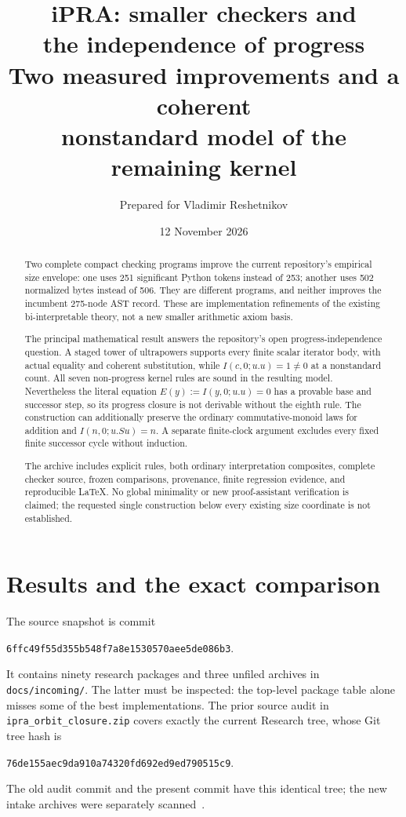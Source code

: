 \documentclass[11pt,letterpaper]{article}
\title{\textbf{iPRA: smaller checkers and\\the independence of progress}\\[0.6em]\large Two measured improvements and a coherent\\nonstandard model of the remaining kernel}
\author{Prepared for Vladimir Reshetnikov}
\date{12 November 2026}
\theoremstyle{definition}
\newcommand{\file}[1]{{\small\nolinkurl{#1}}}
\begin{document}
\maketitle
\begin{abstract}
Two complete compact checking programs improve the current repository's empirical size envelope: one uses 251 significant Python tokens instead of 253; another uses 502 normalized bytes instead of 506. They are different programs, and neither improves the incumbent 275-node AST record. These are implementation refinements of the existing bi-interpretable theory, not a new smaller arithmetic axiom basis.

The principal mathematical result answers the repository's open progress-independence question. A staged tower of ultrapowers supports every finite scalar iterator body, with actual equality and coherent substitution, while $I(c,0;u.u)=1\ne0$ at a nonstandard count. All seven non-progress kernel rules are sound in the resulting model. Nevertheless the literal equation $E(y):=I(y,0;u.u)=0$ has a provable base and successor step, so its progress closure is not derivable without the eighth rule. The construction can additionally preserve the ordinary commutative-monoid laws for addition and $I(n,0;u.Su)=n$. A separate finite-clock argument excludes every fixed finite successor cycle without induction.

The archive includes explicit rules, both ordinary interpretation composites, complete checker source, frozen comparisons, provenance, finite regression evidence, and reproducible LaTeX. No global minimality or new proof-assistant verification is claimed; the requested single construction below every existing size coordinate is not established.
\end{abstract}
\tableofcontents
\newpage

\section{Results and the exact comparison}
\label{sec:results}

The source snapshot is commit
\begin{center}\texttt{6ffc49f55d355b548f7a8e1530570aee5de086b3}.\end{center}
It contains ninety research packages and three unfiled archives in
\file{docs/incoming/}. The latter must be inspected: the top-level package
table alone misses some of the best implementations. The prior source
audit in \file{ipra_orbit_closure.zip} covers exactly the current Research
tree, whose Git tree hash is
\begin{center}\texttt{76de155aec9da910a74320fd692ed9ed790515c9}.\end{center}
The old audit commit and the present commit have this identical tree;
the new intake archives were separately scanned~\cite{repo,incoming}.
\end{document}
